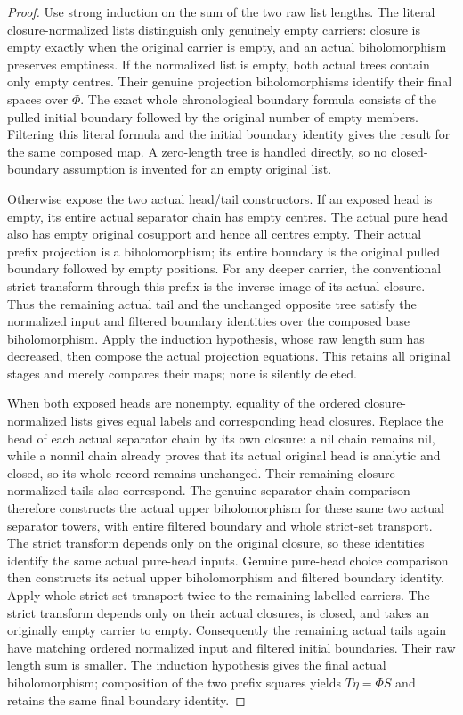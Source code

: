 \begin{proof}
Use strong induction on the sum of the two raw list lengths. The
literal closure-normalized lists distinguish only genuinely empty
carriers: closure is empty exactly when the original carrier is empty,
and an actual biholomorphism preserves emptiness. If the normalized
list is empty, both actual trees contain only empty centres. Their
genuine projection biholomorphisms identify their final spaces over
$\Phi$. The exact whole chronological boundary formula consists of
the pulled initial boundary followed by the original number of empty
members. Filtering this literal formula and the initial boundary
identity gives the result for the same composed map. A zero-length
tree is handled directly, so no closed-boundary assumption is invented
for an empty original list.

Otherwise expose the two actual head/tail constructors. If an exposed
head is empty, its entire actual separator chain has empty centres.
The actual pure head also has empty original cosupport and hence all
centres empty. Their actual prefix projection is a biholomorphism;
its entire boundary is the original pulled boundary followed by empty
positions. For any deeper carrier, the conventional strict transform
through this prefix is the inverse image of its actual closure.
Thus the remaining actual tail and the unchanged opposite tree satisfy
the normalized input and filtered boundary identities over the composed
base biholomorphism. Apply the induction hypothesis, whose raw length
sum has decreased, then compose the actual projection equations. This
retains all original stages and merely compares their maps; none is
silently deleted.

When both exposed heads are nonempty, equality of the ordered
closure-normalized lists gives equal labels and corresponding head
closures. Replace the head of each actual separator chain by its own
closure: a nil chain remains nil, while a nonnil chain already proves
that its actual original head is analytic and closed, so its whole
record remains unchanged. Their remaining closure-normalized tails
also correspond. The genuine separator-chain comparison therefore
constructs the actual upper biholomorphism for these same two actual
separator towers, with entire filtered boundary and whole strict-set
transport. The strict transform depends only on the original closure,
so these identities identify the same actual pure-head inputs. Genuine pure-head choice comparison then constructs its
actual upper biholomorphism and filtered boundary identity. Apply whole
strict-set transport twice to the remaining labelled carriers. The
strict transform depends only on their actual closures, is closed,
and takes an originally empty carrier to empty. Consequently the
remaining actual tails again have matching ordered normalized input
and filtered initial boundaries. Their raw length sum is smaller.
The induction hypothesis gives the final actual biholomorphism;
composition of the two prefix squares yields $T\eta=\Phi S$ and
retains the same final boundary identity.


\end{proof}
